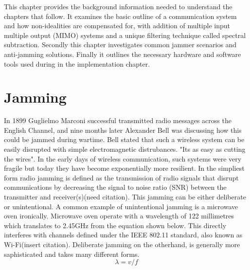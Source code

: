 
This chapter provides the background information needed to understand the chapters that follow.  It examines the basic outline of a communication system and how non-idealities are compensated for, with addition of multiple input multiple output (MIMO) systems and a unique filtering technique called spectral subtraction.   Secondly this chapter investigates common jammer scenarios and anti-jamming solutions.  Finally it outlines the necessary hardware and software tools used during in the implementation chapter.

\section{Jamming}

In 1899 Guglielmo Marconi successful transmitted radio messages across the English Channel, and nine months later Alexander Bell was discussing how this could be jammed during wartime\cite{10}. Bell stated that such a wireless system can be easily disrupted with simple electromagnetic distrubances.  "Its as easy as cutting the wires".\cite{10}  In the early days of wireless communication, such systems were very fragile but today they have become exponentially more resilient. In the simpliest form radio jamming is defined as the transmission of radio signals that disrupt communications by decreasing the signal to noise ratio (SNR) between the transmitter and receiver(s)(need citation).  This jamming can be either deliberate or unintentional.  A common example of unintentional jamming is a microwave oven ironically.  Microwave oven operate with a wavelength of 122 millimetres which translates to 2.45GHz from the equation shown below.  This directly interferes with channels defined under the IEEE 802.11 standard, also known as Wi-Fi(insert citation).  Deliberate jamming on the otherhand, is generally more saphisticated and takes many different forms.\\

\begin{equation}
\lambda=v/f
\end{equation}


